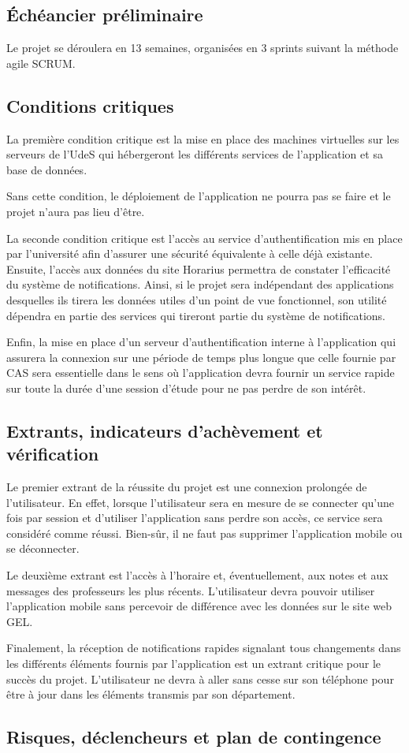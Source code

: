 	\subsection{Échéancier préliminaire}
	Le projet se déroulera en 13 semaines, organisées en 3 sprints suivant la méthode agile SCRUM.

	\subsection{Conditions critiques}
	La première condition critique est la mise en place des machines virtuelles sur les serveurs de l'UdeS qui hébergeront les différents services de l'application et sa base de données.

	Sans cette condition, le déploiement de l'application ne pourra pas se faire et le projet n'aura pas lieu d'être.

	La seconde condition critique est l'accès au service d'authentification mis en place par l'université afin d'assurer une sécurité équivalente à celle déjà existante. Ensuite, l'accès aux données du site Horarius permettra de constater l'efficacité du système de notifications. Ainsi, si le projet sera indépendant des applications desquelles ils tirera les données utiles d'un point de vue fonctionnel, son utilité dépendra en partie des services qui tireront partie du système de notifications.

	Enfin, la mise en place d'un serveur d'authentification interne à l'application qui assurera la connexion sur une période de temps plus longue que celle fournie par CAS sera essentielle dans le sens où l'application devra fournir un service rapide sur toute la durée d'une session d’étude pour ne pas perdre de son intérêt.

	\subsection{Extrants, indicateurs d'achèvement et vérification}
	Le premier extrant de la réussite du projet est une connexion prolongée de l’utilisateur. En effet, lorsque l’utilisateur sera en mesure de se connecter qu’une fois par session et d’utiliser l’application sans perdre son accès, ce service sera considéré comme réussi. Bien-sûr, il ne faut pas supprimer l’application mobile ou se déconnecter.

	Le deuxième extrant est l’accès à l’horaire et, éventuellement, aux notes et aux messages des professeurs les plus récents. L’utilisateur devra pouvoir utiliser l’application mobile sans percevoir de différence avec les données sur le site web GEL.

	Finalement, la réception de notifications rapides signalant tous changements dans les différents éléments fournis par l’application est un extrant critique pour le succès du projet. L’utilisateur ne devra à aller sans cesse sur son téléphone pour être à jour dans les éléments transmis par son département.

	\subsection{Risques, déclencheurs et plan de contingence}
